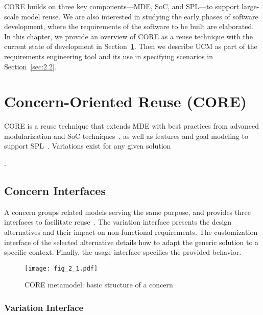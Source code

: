 CORE builds on three key components---MDE, SoC, and SPL---to support large-scale model reuse. We are also interested in studying the early phases of software development, where the requirements of the software to be built are elaborated. In this chapter, we provide an overview of CORE as a reuse technique with the current state of development in Section~\ref{sec:2.1}. Then we describe UCM as part of the requirements engineering tool and its use in specifying scenarios in Section~\ref{sec:2.2}.

\section{Concern-Oriented Reuse (CORE)} \label{sec:2.1}

CORE is a reuse technique that extends MDE with best practices from advanced modularization and SoC techniques~\cite{dijkstra1976discipline}, as well as features and goal modeling to support SPL~\cite{pohl2005software}. Variations exist for any given solution 

.

\subsection{Concern Interfaces}

A concern groups related models serving the same purpose, and provides three interfaces to facilitate reuse~\cite{alam2013concern}. The variation interface presents the design alternatives and their impact on non-functional requirements. The customization interface of the selected alternative details how to adapt the generic solution to a specific context. Finally, the usage interface specifies the provided behavior.

\begin{figure}
	\centering
	\texttt{[image: fig\_2\_1.pdf]}
	\caption{CORE metamodel: basic structure of a concern}
	\label{fig:2.1}
\end{figure}

\subsubsection{Variation Interface}

